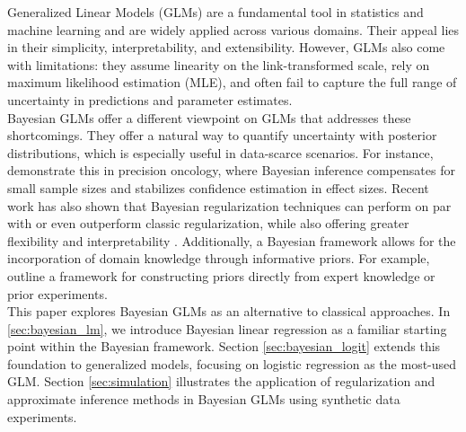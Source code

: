 Generalized Linear Models (GLMs) are a fundamental tool in statistics and machine learning and are widely applied across various domains.
Their appeal lies in their simplicity, interpretability, and extensibility.
However, GLMs also come with limitations:
they assume linearity on the link-transformed scale, rely on maximum likelihood estimation (MLE), and often fail to capture the full range of uncertainty in predictions and parameter estimates.\\

Bayesian GLMs offer a different viewpoint on GLMs that addresses these shortcomings.
They offer a natural way to quantify uncertainty with posterior distributions, which is especially useful in data-scarce scenarios.
For instance, \citet{sondhi_bayesian_2021} demonstrate this in precision oncology, where Bayesian inference compensates for small sample sizes and stabilizes confidence estimation in effect sizes.
Recent work has also shown that Bayesian regularization techniques can perform on par with or even outperform classic regularization, while also offering greater flexibility and interpretability \citep[see e.g.][]{van_erp_shrinkage_2019,celeux_regularization_2012}.
Additionally, a Bayesian framework allows for the incorporation of domain knowledge through informative priors.
For example, \citet{chien_informative_2023} outline a framework for constructing priors directly from expert knowledge or prior experiments.\\

This paper explores Bayesian GLMs as an alternative to classical approaches.
In \autoref{sec:bayesian_lm}, we introduce Bayesian linear regression as a familiar starting point within the Bayesian framework.
Section \ref{sec:bayesian_logit} extends this foundation to generalized models, focusing on logistic regression as the most-used GLM.
Section \ref{sec:simulation} illustrates the application of regularization and approximate inference methods in Bayesian GLMs using synthetic data experiments.\\



